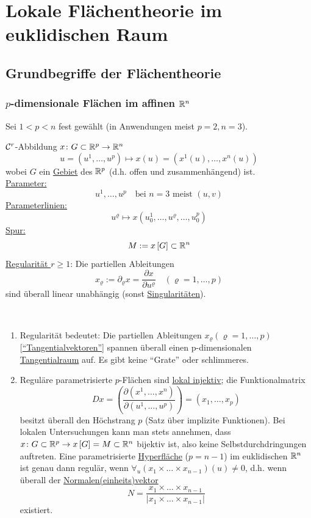   \chapter{Lokale Flächentheorie im euklidischen Raum}
\section{Grundbegriffe der Flächentheorie}
\setcounter{subsection}{-1}
\subsection{$p$-dimensionale Flächen im affinen $\mathbb{R}^n$}
Sei \(1 < p < n\) fest gewählt (in Anwendungen meist \(p = 2, n= 3\)).
 
\begin{definition}
\(\mathcal{C}^r\)-Abbildung \(x\colon G \subset \mathbb{R}^p \to \mathbb{R}^n\)
\[
 u = \left( u^1, \dots , u^p \right) \mapsto x(u) = \left(x^1(u), \dots, x^n (u) \right) 
\]
wobei \(G\) ein \uline{Gebiet} des \(\mathbb{R}^p\) (d.h. offen und zusammenhängend) ist.\\
\uline{Parameter:} \[ u^1, \dots , u^p \quad \text{bei }n = 3\text{ meist }(u,v) \]
\uline{Parameterlinien:}
\[u^\varrho \mapsto x \left(u^1_0, \dots , u^\varrho , \dots , u^p_0 \right)\]
\uline{Spur:} \[M:= x\left[G \right] \subset \mathbb{R}^n\]
\uline{Regularität \(r \geq 1\)}: Die partiellen Ableitungen 
\[x_\varrho := \partial_\varrho x = \frac{\partial x}{\partial u^\varrho} \quad (\varrho = 1, \dots , p)\] 
sind überall linear unabhängig (sonst \uline{Singularitäten}).
\end{definition}

\begin{bemerkung}\(\)
\begin{enumerate}
 \item Regularität bedeutet: Die partiellen Ableitungen \(x_\varrho (\varrho = 1, \ldots , p)\) [\underline{"`Tangentialvektoren"'}] spannen überall einen p-dimensionalen \uline{Tangentialraum} auf. Es gibt keine "`Grate"' oder schlimmeres.
 \item Reguläre parametrisierte \(p\)-Flächen sind \uline{lokal injektiv}; die Funktionalmatrix 
\[Dx = \left(\frac{\partial (x^1, \dots , x^n)}{\partial (u^1, \ldots , u^p)}\right) = \left(x_1, \ldots , x_p\right)\]
besitzt überall den Höchstrang \(p\) (Satz über implizite Funktionen). Bei lokalen Untersuchungen kann man stets annehmen, dass \(x \colon G \subset \mathbb{R}^p \rightarrow x \left[G \right] = M \subset \mathbb{R}^n\) bijektiv ist, also keine Selbstdurchdringungen auftreten. Eine parametrisierte \uline{Hyperfläche} (\(p = n-1\)) im euklidischen \(\mathbb{R}^n\) ist genau dann regulär, wenn \(\forall_{u} \left(x_1 \times \ldots \times x_{n-1} \right) (u) \neq 0\), d.h. wenn überall der \uline{Normalen(einheits)vektor} 
\[N = \frac{x_1 \times \ldots \times x_{n-1}}{|x_1 \times \ldots \times x_{n-1}|}\] 
existiert.
\end{enumerate}
\end{bemerkung}

